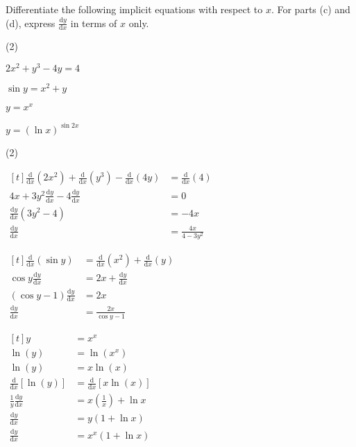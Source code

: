 \documentclass[11pt,a4paper]{book}
\begin{document}
\begin{example}

Differentiate the following implicit equations with respect to $x$.
For parts (c) and (d), express ${\displaystyle \frac{\mathrm{d}y}{\mathrm{d}x}}$ in
terms of $x$ only.

\begin{tasks}[label=(\alph*),label-width=3.5ex](2)

\task $2x^{2}+y^{3}-4y=4$


\task $\sin y=x^{2}+y$

\task $y=x^{x}$

\task $y=\left(\ln x\right)^{\sin2x}$

\end{tasks}

\Solution

\begin{tasks}[label=(\alph*),label-width=3.5ex,after-item-skip=1.5cm](2)

\task
$
\begin{aligned}[t]
{\displaystyle \frac{\mathrm{d}}{\mathrm{d}x}{\displaystyle \left(2x^{2}\right)+\frac{\mathrm{d}}{\mathrm{d}x}\left(y^{3}\right)-\frac{\mathrm{d}}{\mathrm{d}x}\left(4y\right)}} & =\frac{\mathrm{d}}{\mathrm{d}x}\left(4\right)\\
4x+3y^{2}\frac{\mathrm{d}y}{\mathrm{d}x}-4\frac{\mathrm{d}y}{\mathrm{d}x} & =0\\
\frac{\mathrm{d}y}{\mathrm{d}x}\left(3y^{2}-4\right) & =-4x\\
\frac{\mathrm{d}y}{\mathrm{d}x} & =\frac{4x}{4-3y^{2}}
\end{aligned}
$



\task
$
\begin{aligned}[t]
{\displaystyle \frac{\mathrm{d}}{\mathrm{d}x}{\displaystyle \left(\sin y\right)}} & =\frac{\mathrm{d}}{\mathrm{d}x}\left(x^{2}\right)+\frac{\mathrm{d}}{\mathrm{d}x}\left(y\right)\\
\cos y\frac{\mathrm{d}y}{\mathrm{d}x} & =2x+\frac{\mathrm{d}y}{\mathrm{d}x}\\
\left(\cos y-1\right)\frac{\mathrm{d}y}{\mathrm{d}x} & =2x\\
\frac{\mathrm{d}y}{\mathrm{d}x} & =\frac{2x}{\cos y-1}
\end{aligned}
$


\task
$
\begin{aligned}[t]
y & =x^{x}\\
\ln\left(y\right) & =\ln\left(x^{x}\right)\\
\ln\left(y\right) & =x\ln\left(x\right)\\
\frac{\mathrm{d}}{\mathrm{d}x}\left[\ln\left(y\right)\right] & =\frac{\mathrm{d}}{\mathrm{d}x}\left[x\ln\left(x\right)\right]\\
\frac{1}{y}\frac{\mathrm{d}y}{\mathrm{d}x} & =x\left(\frac{1}{x}\right)+\ln x\\
\frac{\mathrm{d}y}{\mathrm{d}x} & =y\left(1+\ln x\right)\\
\frac{\mathrm{d}y}{\mathrm{d}x} & =x^{x}\left(1+\ln x\right)
\end{aligned}
$


\end{tasks}
\end{example}
\end{document}
